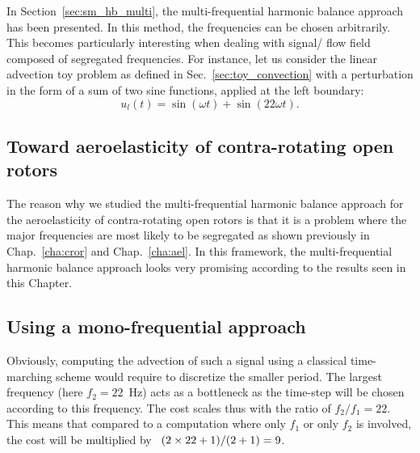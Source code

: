 

In Section~\ref{sec:sm_hb_multi}, the multi-frequential harmonic
balance approach has been presented. In this method,
the frequencies can be chosen arbitrarily. This becomes particularly
interesting when dealing with signal/ flow field composed of segregated
frequencies. For instance, let us consider the linear advection toy problem
as defined in Sec.~\ref{sec:toy_convection} with 
a perturbation 
in the form of a sum of two sine functions,
applied at the left boundary:
\begin{equation}
    u_l(t) = \sin(\omega t) + \sin(22 \omega t).
    \label{eq:multifreq_inj_func}
\end{equation}

\subsection{Toward aeroelasticity of contra-rotating open rotors}
The reason why we studied the multi-frequential harmonic balance
approach for the aeroelasticity of contra-rotating open rotors
is that it is a problem where the major frequencies are most
likely to be segregated as shown previously in Chap.~\ref{cha:cror} and
Chap.~\ref{cha:ael}. In this framework, the multi-frequential
harmonic balance approach looks very promising according to the results
seen in this Chapter.

\subsection{Using a mono-frequential approach}

Obviously, computing the advection of such a signal using
a classical time-marching scheme would require to discretize the
smaller period. The largest frequency
(here $f_2 = 22$~Hz) acts as a bottleneck as the time-step will be chosen
according to this frequency. The cost scales thus with the ratio of $f_2 / f_1 = 22$. This
means that compared to a computation where only $f_1$ or only $f_2$
is involved, the cost will be multiplied by~ \mbox{$(2 \times 22 + 1) / (2 \time 1+1) = 9$}.

